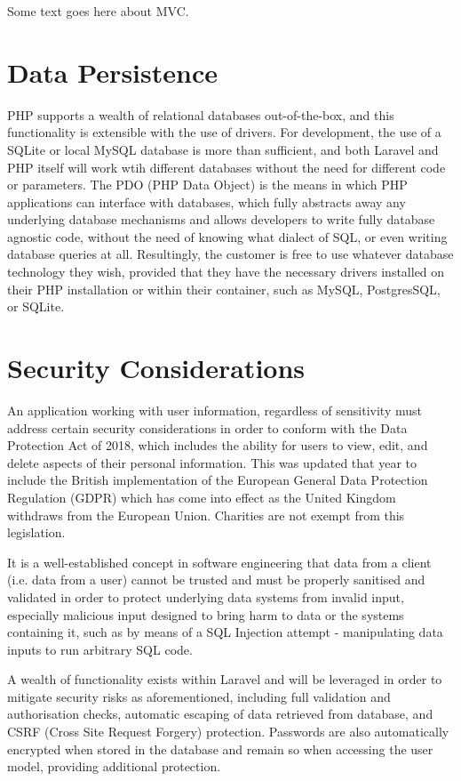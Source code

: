 Some text goes here about MVC.

\section{Data Persistence}

PHP supports a wealth of relational databases out-of-the-box, and this functionality is extensible with the use of drivers. For development, the use of a SQLite or local MySQL database is more than sufficient, and both Laravel and PHP itself will work wtih different databases without the need for different code or parameters. The PDO (PHP Data Object) is the means in which PHP applications can interface with databases, which fully abstracts away any underlying database mechanisms and allows developers to write fully database agnostic code, without the need of knowing what dialect of SQL, or even writing database queries at all. Resultingly, the customer is free to use whatever database technology they wish, provided that they have the necessary drivers installed on their PHP installation or within their container, such as MySQL, PostgresSQL, or SQLite. \cite{PHP1}

\section{Security Considerations}
An application working with user information, regardless of sensitivity must address certain security considerations in order to conform with the Data Protection Act of 2018, which includes the ability for users to view, edit, and delete aspects of their personal information. This was updated that year to include the British implementation of the European General Data Protection Regulation (GDPR) which has come into effect as the United Kingdom withdraws from the European Union. Charities are not exempt from this legislation. \cite{HMGovt1} \cite{HMGovt2}

It is a well-established concept in software engineering that data from a client (i.e. data from a user) cannot be trusted and must be properly sanitised and validated in order to protect underlying data systems from invalid input, especially malicious input designed to bring harm to data or the systems containing it, such as by means of a SQL Injection attempt - manipulating data inputs to run arbitrary SQL code. \cite{CorePHPProgramming} \cite{Microsoft2}

A wealth of functionality exists within Laravel and will be leveraged in order to mitigate security risks as aforementioned, including full validation and authorisation checks, automatic escaping of data retrieved from database, and CSRF (Cross Site Request Forgery) protection. Passwords are also automatically encrypted when stored in the database and remain so when accessing the user model, providing additional protection. \cite{Laravel4} \cite{Laravel5}

